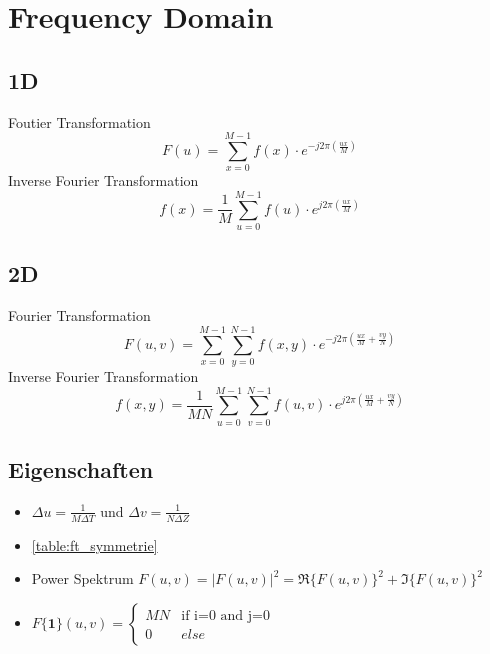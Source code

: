\section{Frequency Domain}
\subsection{1D} 
Foutier Transformation
\[
F(u) = \sum_{x=0}^{M-1}f(x)\cdot e ^{-j2\pi\left(\frac{ux}{M}\right)}
\]
Inverse Fourier Transformation
\[
f(x) = \frac{1}{M} \sum_{u=0}^{M-1}f(u)\cdot e ^{j2\pi\left(\frac{ux}{M}\right)}
\]

\subsection{2D}
Fourier Transformation
\[
F(u,v) = \sum_{x=0}^{M-1}\sum_{y=0}^{N-1}f(x, y)\cdot e ^{-j2\pi\left(\frac{ux}{M}+\frac{vy}{N}\right)}
\]
Inverse Fourier Transformation
\[
f(x, y) = \frac{1}{MN} \sum_{u=0}^{M-1}\sum_{v=0}^{N-1}f(u, v)\cdot e ^{j2\pi\left(\frac{ux}{M}+\frac{vy}{N}\right)}
\]

\subsection{Eigenschaften}
\begin{itemize}
	\item $\Delta u = \frac{1}{M\Delta T}$ und $\Delta v = \frac{1}{N\Delta Z}$
	\item \autoref{table:ft_symmetrie}
	\item Power Spektrum $F(u,v) = \left|F(u,v)\right|^2 = \Re\{F(u,v)\}^2 + \Im\{F(u,v)\}^2$
	\item $F\{\mathbf{1}\}(u, v) = \begin{cases}
		MN & \text{if i=0 and j=0}\\
		0 & else
	\end{cases}$
\end{itemize}

